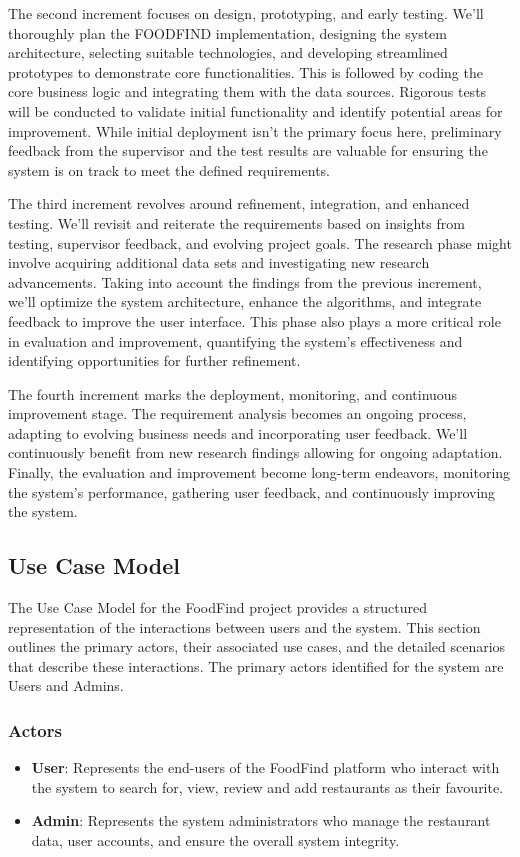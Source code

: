 \documentclass[12pt, a4paper, oneside]{article}
\begin{document}
The second increment focuses on design, prototyping, and early testing. We’ll thoroughly plan the FOODFIND implementation, designing the system architecture, selecting suitable technologies, and developing streamlined prototypes to demonstrate core functionalities. This is followed by coding the core business logic and integrating them with the data sources. Rigorous tests will be conducted to validate initial functionality and identify potential areas for improvement. While initial deployment isn’t the primary focus here, preliminary feedback from the supervisor and the test results are valuable for ensuring the system is on track to meet the defined requirements.

The third increment revolves around refinement, integration, and enhanced testing. We’ll revisit and reiterate the requirements based on insights from testing, supervisor feedback, and evolving project goals. The research phase might involve acquiring additional data sets and investigating new research advancements. Taking into account the findings from the previous increment, we’ll optimize the system architecture, enhance the algorithms, and integrate feedback to improve the user interface. This phase also plays a more critical role in evaluation and improvement, quantifying the system’s effectiveness and identifying opportunities for further refinement.

The fourth increment marks the deployment, monitoring, and continuous improvement stage. The requirement analysis becomes an ongoing process, adapting to evolving business needs and incorporating user feedback. We’ll continuously benefit from new research findings allowing for ongoing adaptation. Finally, the evaluation and improvement become long-term endeavors, monitoring the system’s performance, gathering user feedback, and continuously improving the system.
\pagebreak

\subsection{Use Case Model}
The Use Case Model for the FoodFind project provides a structured representation of the interactions between users and the system. This section outlines the primary actors, their associated use cases, and the detailed scenarios that describe these interactions. The primary actors identified for the system are Users and Admins.

\subsubsection{Actors}
\begin{itemize}
    \item \textbf{User}: Represents the end-users of the FoodFind platform who interact with the system to search for, view, review and add restaurants as their favourite.
    \item \textbf{Admin}: Represents the system administrators who manage the restaurant data, user accounts, and ensure the overall system integrity.
\end{itemize}
\end{document}
